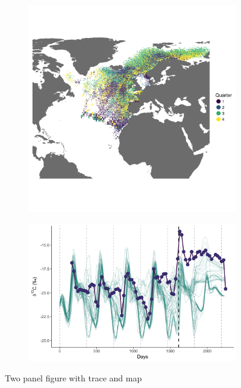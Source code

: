 \documentclass[a4paper,12pt]{article}
\begin{document}
\begin{figure}
  \centering
    \begin{subfigure}[b]{0.45\textwidth}
      \centering
      \includegraphics[width = \linewidth]{figures/Figure-1b-migratory-model-full-map.png}
      \label{figa}
    \end{subfigure}

    \begin{subfigure}[b]{0.45\textwidth}
      \centering
      \includegraphics[width = \linewidth]{figures/Figure-1c-migratory-model-d13C.png}
      \label{figb}
    \end{subfigure} 
  \caption{Two panel figure with trace and map}
\end{figure}
\end{document}
